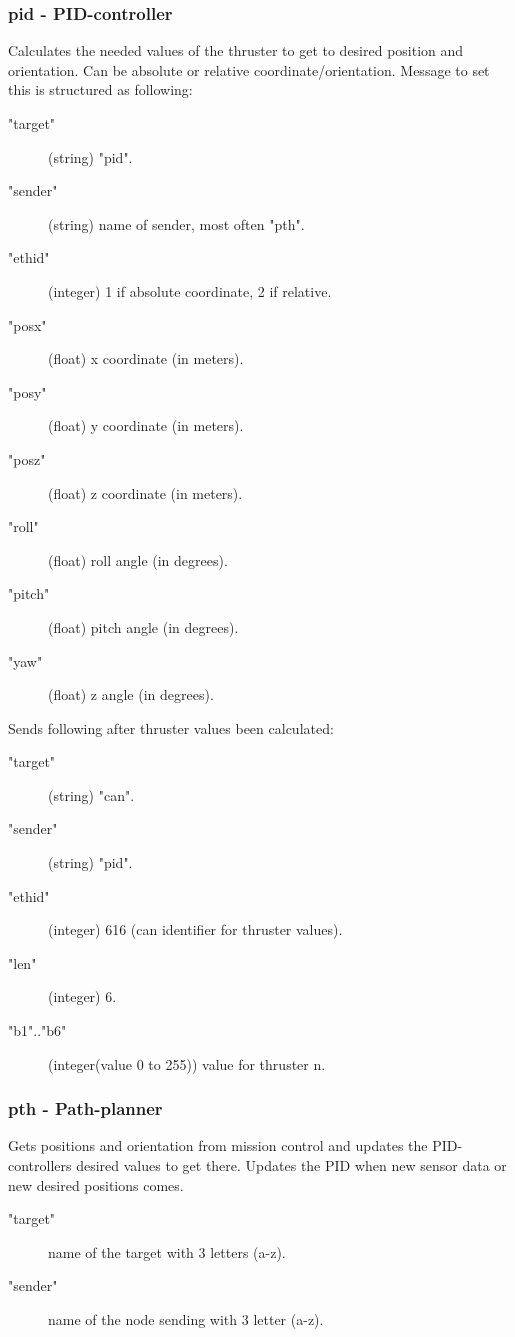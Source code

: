 \subsubsection{pid - PID-controller}
Calculates the needed values of the thruster to get to desired position and orientation.
Can be absolute or relative coordinate/orientation.
Message to set this is structured as following:
\begin{description}
  \item["target"] (string) "pid".
  \item["sender"] (string) name of sender, most often "pth".
  \item["ethid"] (integer) 1 if absolute coordinate, 2 if relative.
  \item["posx"] (float) x coordinate (in meters).
  \item["posy"] (float) y coordinate (in meters).
  \item["posz"] (float) z coordinate (in meters).
  \item["roll"] (float) roll angle (in degrees).
  \item["pitch"] (float) pitch angle (in degrees).
  \item["yaw"] (float) z angle (in degrees).
\end{description}
Sends following after thruster values been calculated:
\begin{description}
  \item["target"] (string) "can".
  \item["sender"] (string) "pid".
  \item["ethid"] (integer) 616 (can identifier for thruster values).
  \item["len"] (integer) 6.
  \item["b1".."b6"] (integer(value 0 to 255)) value for thruster n.
\end{description}

\subsubsection{pth - Path-planner}
Gets positions and orientation from mission control and updates the PID-controllers desired values to get there.
Updates the PID when new sensor data or new desired positions comes. 
\begin{description}
  \item["target"] name of the target with 3 letters (a-z).
  \item["sender"] name of the node sending  with 3 letter (a-z).
\end{description}

